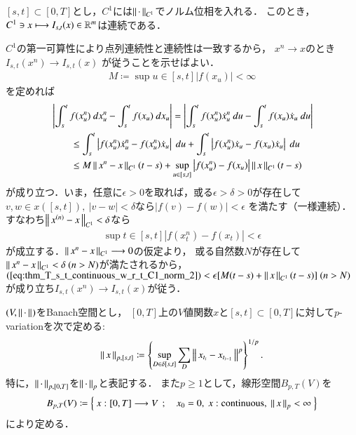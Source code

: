 \begin{screen}
	\begin{thm}\label{thm:T_s_t_continuous_w_r_t_C1_norm}
		$[s,t] \subset [0,T]$とし，$C^1$には$\left\|\, \cdot\, \right\|_{C^1}$でノルム位相を入れる．
		このとき，$C^1 \ni x \longmapsto I_{s,t}(x) \in \mathbb{R}^m$は連続である．
	\end{thm}
\end{screen}

\begin{prf}
	$C^1$の第一可算性により点列連続性と連続性は一致するから，
	$x^n \longrightarrow x$のとき$I_{s,t}(x^n) \longrightarrow I_{s,t}(x)$
	が従うことを示せばよい．
	\begin{align}
		M \coloneqq \sup{u \in [s,t]}{|f(x_u)|} < \infty
	\end{align}
	を定めれば
	\begin{align}
		&\left| \int_s^t f(x^n_u)\ dx^n_u
			- \int_s^t f(x_u)\ dx_u \right|
		= \left| \int_s^t f(x^n_u)\dot{x}^n_u\ du
			- \int_s^t f(x_u)\dot{x}_u\ du \right| \\
		&\qquad \leq \int_s^t \left| f(x^n_u)\dot{x}^n_u - f(x^n_u)\dot{x}_u \right|\ du
			+ \int_s^t \left| f(x^n_u)\dot{x}_u - f(x_u)\dot{x}_u \right|\ du \\
		&\qquad \leq M \left\|\, x^n - x\, \right\|_{C^1} (t-s)
			+ \operatorname*{sup}_{u \in [s,t]} \left| f(x^n_u) - f(x_u) \right| \left\|\, x\, \right\|_{C^1}(t-s)
			\label{eq:thm_T_s_t_continuous_w_r_t_C1_norm_2}
	\end{align}
	が成り立つ．いま，任意に$\epsilon > 0$を取れば，或る$\epsilon > \delta > 0$が存在して
	$v,w \in x([s,t]),\ |v - w| < \delta$なら$|f(v) - f(w)| < \epsilon$
	を満たす（一様連続）．すなわち$\left\|\, x^{(n)} - x\, \right\|_{C^1} < \delta$なら
	\begin{align}
		\sup{t \in [s,t]}{\left|f(x^n_t) - f(x_t) \right|} < \epsilon
	\end{align}
	が成立する．$\left\|\, x^n - x\, \right\|_{C^1} \longrightarrow 0$の仮定より，
	或る自然数$N$が存在して$\left\|\, x^n - x\, \right\|_{C^1} < \delta\ (n > N)$が満たされるから，
	$(\refeq{eq:thm_T_s_t_continuous_w_r_t_C1_norm_2}) < \epsilon[M(t-s) + \Norm{x}{C^1}(t-s)]\ (n > N)$
	が成り立ち$I_{s,t}(x^n) \longrightarrow I_{s,t}(x)$が従う．
	\QED
\end{prf}

\begin{screen}
	\begin{dfn}[$p$-variation]
		$(V,\left\|\, \cdot\, \right\|_{})$をBanach空間とし，
		$[0,T]$上の$V$値関数$x$と$[s,t] \subset [0,T]$に対して$p$-variationを次で定める:
		\begin{align}
			\left\|\, x\, \right\|_{p,[s,t]}
			\coloneqq \left\{ \operatorname*{sup}_{D \in \delta[s,t]} \sum_{D} 
				\left\|\, x_{t_i} - x_{t_{i-1}}\, \right\|_{}^p \right\}^{1/p}.
		\end{align}
		特に，$\left\|\, \cdot\, \right\|_{p,[0,T]}$を$\left\|\, \cdot\, \right\|_{p}$と表記する．
		また$p \geq 1$として，線形空間$B_{p,T}(V)$を
		\begin{align}
			B_{p,T}(V)
			\coloneqq \Set{x:[0,T] \longrightarrow V}{x_0=0,\ x:\mbox{continuous},\ \Norm{x}{p} < \infty}
		\end{align}
		により定める．
	\end{dfn}
\end{screen}

